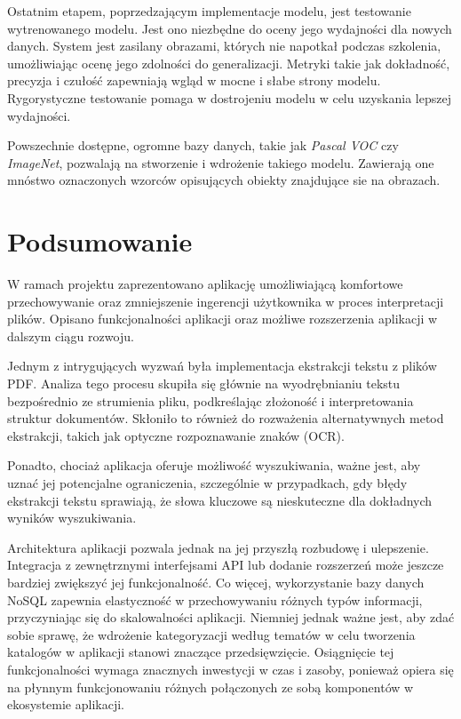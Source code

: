 \documentclass[12pt,a4paper,twoside]{article}
\begin{document}
Ostatnim etapem, poprzedzającym implementacje modelu, jest testowanie wytrenowanego modelu. Jest ono niezbędne do oceny jego wydajności dla nowych danych. System jest zasilany obrazami, których nie napotkał podczas szkolenia, umożliwiając ocenę jego zdolności do generalizacji. Metryki takie jak dokładność, precyzja i czułość zapewniają wgląd w mocne i słabe strony modelu. Rygorystyczne testowanie pomaga w dostrojeniu modelu w celu uzyskania lepszej wydajności.\par
Powszechnie dostępne, ogromne bazy danych, takie jak \textit{Pascal VOC} czy \textit{ImageNet}, pozwalają na stworzenie i wdrożenie takiego modelu. Zawierają one mnóstwo oznaczonych wzorców opisujących obiekty znajdujące sie na obrazach. 
\newpage
\section*{Podsumowanie}
W ramach projektu zaprezentowano aplikację umożliwiającą komfortowe przechowywanie oraz zmniejszenie ingerencji użytkownika w proces interpretacji plików. Opisano funkcjonalności aplikacji oraz możliwe rozszerzenia  aplikacji w dalszym ciągu rozwoju. \par
Jednym z intrygujących wyzwań była implementacja ekstrakcji tekstu z plików PDF. Analiza tego procesu skupiła się głównie na wyodrębnianiu tekstu bezpośrednio ze strumienia pliku, podkreślając złożoność i interpretowania struktur dokumentów. Skłoniło to również do rozważenia alternatywnych metod ekstrakcji, takich jak optyczne rozpoznawanie znaków (OCR). \par
Ponadto, chociaż aplikacja oferuje możliwość wyszukiwania, ważne jest, aby uznać jej potencjalne ograniczenia, szczególnie w przypadkach, gdy błędy ekstrakcji tekstu sprawiają, że słowa kluczowe są nieskuteczne dla dokładnych wyników wyszukiwania.\par
Architektura aplikacji pozwala jednak na jej przyszłą rozbudowę i ulepszenie. Integracja z zewnętrznymi interfejsami API lub dodanie rozszerzeń może jeszcze bardziej zwiększyć jej funkcjonalność. Co więcej, wykorzystanie bazy danych NoSQL zapewnia elastyczność w przechowywaniu różnych typów informacji, przyczyniając się do skalowalności aplikacji. Niemniej jednak ważne jest, aby zdać sobie sprawę, że wdrożenie kategoryzacji według tematów w celu tworzenia katalogów w aplikacji stanowi znaczące przedsięwzięcie. Osiągnięcie tej funkcjonalności wymaga znacznych inwestycji w czas i zasoby, ponieważ opiera się na płynnym funkcjonowaniu różnych połączonych ze sobą komponentów w ekosystemie aplikacji.
\newpage
\listoffigures
{}


\end{document}

